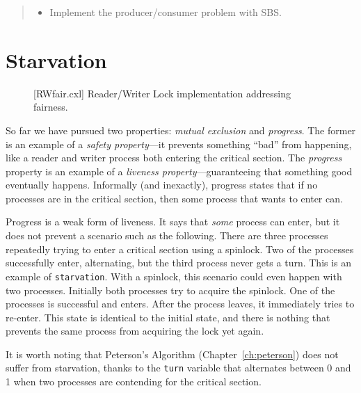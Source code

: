 \documentclass{report}
\newenvironment{code}{
\tcolorbox
}{
\endtcolorbox
}
\begin{document}
\begin{quote}
\begin{itemize}
\item Implement the producer/consumer problem with SBS.
\end{itemize}
\end{quote}

\chapter{Starvation}
\label{ch:starvation}

\begin{figure}
\begin{code}
\end{code}
\caption{[RWfair.cxl] Reader/Writer Lock implementation addressing fairness.}
\label{fig:RWfair}
\end{figure}

So far we have pursued two properties: \emph{mutual exclusion}
and \emph{progress}.  The former is an example of a
\emph{safety property}---it prevents something ``bad'' from
happening, like a reader and writer process both entering the
critical section.  The \emph{progress} property is an example
of a \emph{liveness property}---guaranteeing that something good
eventually happens.
Informally (and inexactly), progress states that if no processes
are in the critical section, then some process that wants to enter
can.

Progress is a weak form of liveness.  It says that \emph{some}
process can enter, but it does not prevent a scenario such as
the following.  There are three processes repeatedly trying to
enter a critical section using a spinlock.  Two of
the processes successfully enter, alternating, but the third
process never gets a turn.  This is an example of
\texttt{starvation}.  With a spinlock, this scenario could
even happen with two processes.  Initially both processes
try to acquire the spinlock.  One of the processes is
successful and enters.  After the process leaves, it immediately
tries to re-enter.  This state is identical to the initial
state, and there is nothing that prevents the same process
from acquiring the lock yet again.

It is worth noting that Peterson's Algorithm (Chapter~\ref{ch:peterson})
does not suffer from starvation, thanks to the \texttt{turn} variable
that alternates between 0 and 1 when two processes are contending for
the critical section.
\end{document}
